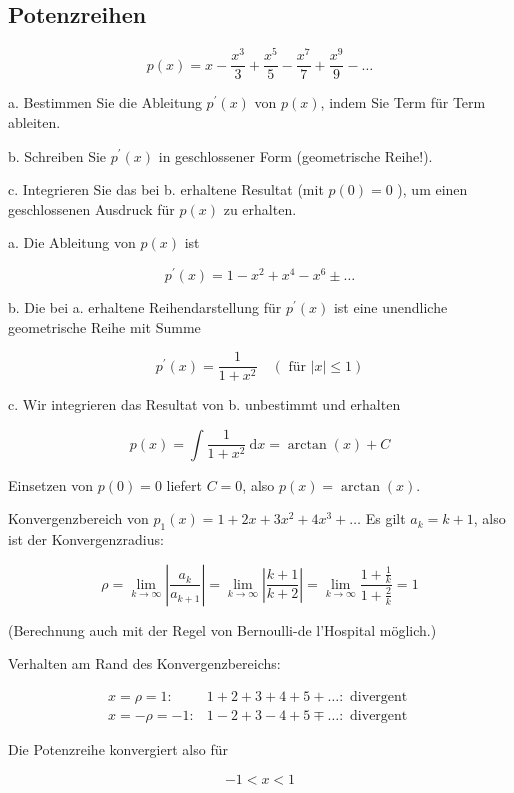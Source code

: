     






\subsection{Potenzreihen}

\begin{example}

$$
p(x)=x-\frac{x^{3}}{3}+\frac{x^{5}}{5}-\frac{x^{7}}{7}+\frac{x^{9}}{9}-\ldots
$$

a. Bestimmen Sie die Ableitung $p^{\prime}(x)$ von $p(x)$, indem Sie Term für Term ableiten.

b. Schreiben Sie $p^{\prime}(x)$ in geschlossener Form (geometrische Reihe!).

c. Integrieren Sie das bei b. erhaltene Resultat (mit $p(0)=0$ ), um einen geschlossenen Ausdruck für $p(x)$ zu erhalten.
\tcblower

a. Die Ableitung von $p(x)$ ist

$$
p^{\prime}(x)=1-x^{2}+x^{4}-x^{6} \pm \ldots
$$

b. Die bei a. erhaltene Reihendarstellung für $p^{\prime}(x)$ ist eine unendliche geometrische Reihe mit Summe

$$
p^{\prime}(x)=\frac{1}{1+x^{2}} \quad(\text { für }|x| \leq 1)
$$

c. Wir integrieren das Resultat von b. unbestimmt und erhalten

$$
p(x)=\int \frac{1}{1+x^{2}} \mathrm{~d} x=\arctan (x)+C
$$

Einsetzen von $p(0)=0$ liefert $C=0$, also $p(x)=\arctan (x)$.
\end{example}




\begin{example}
    Konvergenzbereich von $p_{1}(x)=1+2 x+3 x^{2}+4 x^{3}+\ldots$
\tcblower
 Es gilt $a_{k}=k+1$, also ist der Konvergenzradius:

$$
\rho=\lim _{k \rightarrow \infty}\left|\frac{a_{k}}{a_{k+1}}\right|=\lim _{k \rightarrow \infty}\left|\frac{k+1}{k+2}\right|=\lim _{k \rightarrow \infty} \frac{1+\frac{1}{k}}{1+\frac{2}{k}}=1
$$

(Berechnung auch mit der Regel von Bernoulli-de l'Hospital möglich.)

Verhalten am Rand des Konvergenzbereichs:

$$
\begin{aligned}
x=\rho=1: & 1+2+3+4+5+\ldots: \text { divergent } \\
x=-\rho=-1: & 1-2+3-4+5 \mp \ldots: \text { divergent }
\end{aligned}
$$

Die Potenzreihe konvergiert also für

$$
-1<x<1
$$
\end{example}


